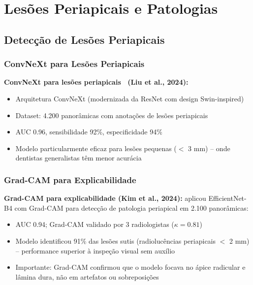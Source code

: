 \section{Lesões Periapicais e Patologias}
\label{sec:lesoes-periapicais}

\subsection{Detecção de Lesões Periapicais}

\subsubsection{ConvNeXt para Lesões Periapicais}

\textbf{ConvNeXt para lesões periapicais~\cite{liu2024convnext} (Liu et al., 2024):}
\begin{itemize}
  \item Arquitetura ConvNeXt (modernizada da ResNet com design Swin-inspired)
  \item Dataset: 4.200 panorâmicas com anotações de lesões periapicais
  \item AUC 0.96, sensibilidade 92\%, especificidade 94\%
  \item Modelo particularmente eficaz para lesões pequenas ($<$ 3 mm) -- onde
        dentistas generalistas têm menor acurácia
\end{itemize}

\subsubsection{Grad-CAM para Explicabilidade}

\textbf{Grad-CAM para explicabilidade (Kim et al., 2024):}
 aplicou EfficientNet-B4 com Grad-CAM para detecção de
patologia periapical em 2.100 panorâmicas:
\begin{itemize}
  \item AUC 0.94; Grad-CAM validado por 3 radiologistas ($\kappa = 0.81$)
  \item Modelo identificou 91\% das lesões sutis (radiolucências periapicais
        $<$ 2 mm) -- performance superior à inspeção visual sem auxílio
  \item Importante: Grad-CAM confirmou que o modelo focava no ápice radicular
        e lâmina dura, não em artefatos ou sobreposições
\end{itemize}

